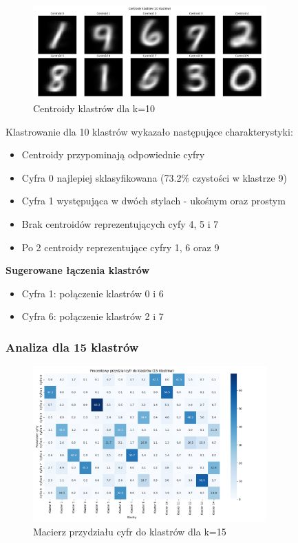 \documentclass[12pt,a4paper]{article}
\begin{document}
\begin{figure}[H]
\centering
\includegraphics[width=0.8\textwidth]{img/centroidy10.png}
\caption{Centroidy klastrów dla k=10}
\end{figure}

Klastrowanie dla 10 klastrów wykazało następujące charakterystyki:
\begin{itemize}
    \item Centroidy przypominają odpowiednie cyfry
    \item Cyfra 0 najlepiej sklasyfikowana (73.2\% czystości w klastrze 9)
    \item Cyfra 1 występująca w dwóch stylach - ukośnym oraz prostym
    \item Brak centroidów reprezentujących cyfy 4, 5 i 7
    \item Po 2 centroidy reprezentujące cyfry 1, 6 oraz 9
\end{itemize}

\noindent \textbf{Sugerowane łączenia klastrów}
\begin{itemize}
    \item Cyfra 1: połączenie klastrów 0 i 6
    \item Cyfra 6: połączenie klastrów 2 i 7
\end{itemize}

\subsubsection{Analiza dla 15 klastrów}

\begin{figure}[H]
\centering
\includegraphics[width=0.8\textwidth]{img/macierz15.png}
\caption{Macierz przydziału cyfr do klastrów dla k=15}
\end{figure}
\end{document}
